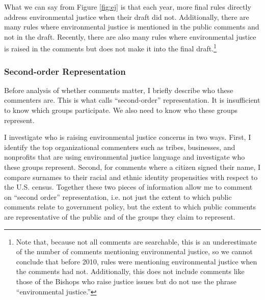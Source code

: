 What we can say from Figure  \ref{fig:ej}  is that each year, more final rules directly address environmental justice when their draft did not. Additionally, there are many rules where environmental justice is mentioned in the public comments and not in the draft. Recently, there are also many rules where environmental justice is raised in the comments but does not make it into the final draft.\footnote{Note that, because not all comments are searchable, this is an underestimate of the number of comments mentioning environmental justice, so we cannot conclude that before 2010, rules were mentioning environmental justice when the comments had not. Additionally, this does not include comments like those of the Bishops who raise justice issues but do not use the phrase ``environmental justice.''} 


\subsubsection{Second-order Representation} Before analysis of whether comments matter, I briefly describe who these commenters are. This is what \citet{Seifter2016Second-OrderLaw} calls ``second-order'' representation. It is insufficient to know which groups participate. We also need to know who these groups represent.

I  investigate who is raising environmental justice concerns in two ways. First, I  identify the top organizational commenters such as tribes, businesses, and nonprofits that are using environmental justice language and investigate who these groups represent. Second, for comments where a citizen signed their name, I  compare surnames to their racial and ethnic identity propensities with respect to the U.S. census. Together these two pieces of information allow me to comment on ``second order'' representation, i.e. not just the extent to which public comments relate to government policy, but the extent to which public comments are representative of the public and of the groups they claim to represent. 


